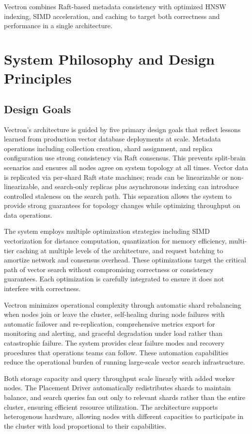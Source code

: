 \documentclass[conference]{IEEEtran}
\begin{document}
Vectron combines Raft-based metadata consistency with optimized HNSW indexing, SIMD acceleration, and caching to target both correctness and performance in a single architecture.

\section{System Philosophy and Design Principles}

\subsection{Design Goals}

Vectron's architecture is guided by five primary design goals that reflect lessons learned from production vector database deployments at scale. Metadata operations including collection creation, shard assignment, and replica configuration use strong consistency via Raft consensus. This prevents split-brain scenarios and ensures all nodes agree on system topology at all times. Vector data is replicated via per-shard Raft state machines; reads can be linearizable or non-linearizable, and search-only replicas plus asynchronous indexing can introduce controlled staleness on the search path. This separation allows the system to provide strong guarantees for topology changes while optimizing throughput on data operations.

The system employs multiple optimization strategies including SIMD vectorization for distance computation, quantization for memory efficiency, multi-tier caching at multiple levels of the architecture, and request batching to amortize network and consensus overhead. These optimizations target the critical path of vector search without compromising correctness or consistency guarantees. Each optimization is carefully integrated to ensure it does not interfere with correctness.

Vectron minimizes operational complexity through automatic shard rebalancing when nodes join or leave the cluster, self-healing during node failures with automatic failover and re-replication, comprehensive metrics export for monitoring and alerting, and graceful degradation under load rather than catastrophic failure. The system provides clear failure modes and recovery procedures that operations teams can follow. These automation capabilities reduce the operational burden of running large-scale vector search infrastructure.

Both storage capacity and query throughput scale linearly with added worker nodes. The Placement Driver automatically redistributes shards to maintain balance, and search queries fan out only to relevant shards rather than the entire cluster, ensuring efficient resource utilization. The architecture supports heterogenous hardware, allowing nodes with different capacities to participate in the cluster with load proportional to their capabilities.
\end{document}
